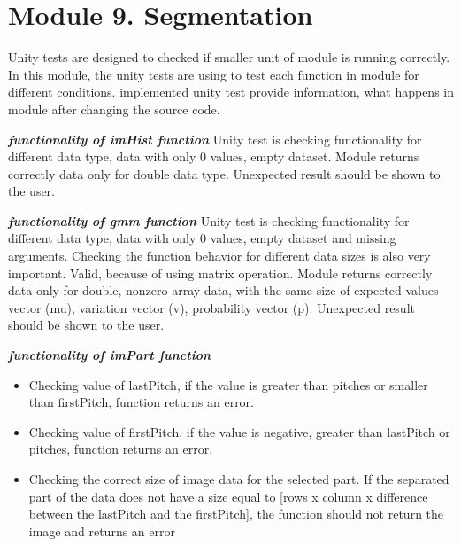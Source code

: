 \section{Module 9. Segmentation}

Unity tests are designed to checked if smaller unit of module is running correctly. In this module, the unity tests are using to test each function in module for different conditions. implemented unity test provide information, what happens in module after changing the source code. 

\textbf{\textit{functionality of imHist function}} 
Unity test is checking functionality for different data type, data with only 0 values, empty dataset. Module returns correctly data only for double data type. Unexpected result should be shown to the user.

\textbf{\textit{functionality of gmm function}}
Unity test is checking functionality for different data type, data with only 0 values, empty dataset and missing arguments. Checking the function behavior for different data sizes is also very important. Valid, because of using matrix operation. 
Module returns correctly data only for double, nonzero array data, with the same size of expected values vector (mu), variation vector (v), probability vector (p). Unexpected result should be shown to the user.

\textbf{\textit{functionality of imPart function}}
\begin{itemize}
	\item Checking value of lastPitch, if the value is greater than pitches or smaller than firstPitch, function returns an error.
	\item Checking value of firstPitch, if the value is negative, greater than lastPitch or pitches, function returns an error.
	\item Checking the correct size of image data for the selected part. If the separated part of the data does not have a size equal to [rows x column x difference between the lastPitch and the firstPitch], the function should not return the image and returns an error
\end{itemize}



